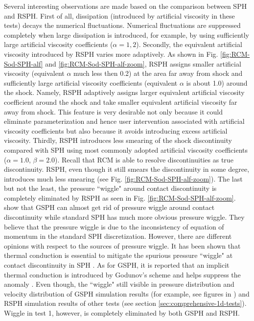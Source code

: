 \documentclass[review]{elsarticle}
\begin{document}
Several interesting observations are made based on the comparison between SPH and RSPH.
First of all, dissipation (introduced by artificial viscosity in these tests) decays the numerical fluctuations. Numerical fluctuations are suppressed completely when large dissipation is introduced, for example, by using sufficiently large artificial viscosity coefficients ($\alpha=1,2$).
Secondly, the equivalent artificial viscosity introduced by RSPH varies more adaptively.
As shown in Fig. \ref{fig:RCM-Sod-SPH-alf} and \ref{fig:RCM-Sod-SPH-alf-zoom}, RSPH assigns smaller artificial viscosity (equivalent $\alpha$ much less then 0.2) at the area far away from shock and sufficiently large artificial viscosity coefficients (equivalent $\alpha$ is about 1.0) around the shock. Namely, RSPH adaptively assigns larger equivalent artificial viscosity coefficient around the shock and take smaller equivalent artificial viscosity far away from shock. This feature is very desirable not only because it could eliminate parameterization and hence user intervention associated with artificial viscosity coefficients but also because it avoids introducing excess artificial viscosity.
Thirdly, RSPH introduces less smearing of the shock discontinuity compared with SPH using most commonly adopted artificial viscosity coefficients ($\alpha=1.0$, $\beta=2.0$). Recall that RCM is able to resolve discontinuities as true discontinuity. RSPH, even though it still smears the discontinuity in some degree, introduces much less smearing (see Fig. \ref{fig:RCM-Sod-SPH-alf-zoom}).
The last but not the least, the pressure ``wiggle" around contact discontinuity is completely eliminated by RSPH as seen in Fig. \ref{fig:RCM-Sod-SPH-alf-zoom}. \citet{inutsuka2002reformulation} show that GSPH can almost get rid of pressure wiggle around contact discontinuity while standard SPH has much more obvious pressure wiggle. They believe that the pressure wiggle is due to the inconsistency of equation of momentum in the standard SPH discretization. However, there are different opinions with respect to the sources of pressure wiggle. It has been shown that thermal conduction is essential to mitigate the spurious pressure ``wiggle" at contact discontinuity in SPH \citep{monaghan1997sph, sigalotti2006shock, price2008modelling, price2012smoothed}. As for GSPH, it is reported that an implicit thermal conduction is introduced by Godunov's scheme and helps suppress the anomaly \citep{puri2014approximate}. Even though, the ``wiggle" still visible in pressure distribution and velocity distribution of GSPH simulation results (for example, see figures in \citep{puri2014comparison}) and RSPH simulation results of other tests (see section \ref{sec:comprehensive-1d-tests}). Wiggle in test 1, however, is completely eliminated by both GSPH and RSPH.
\end{document}
